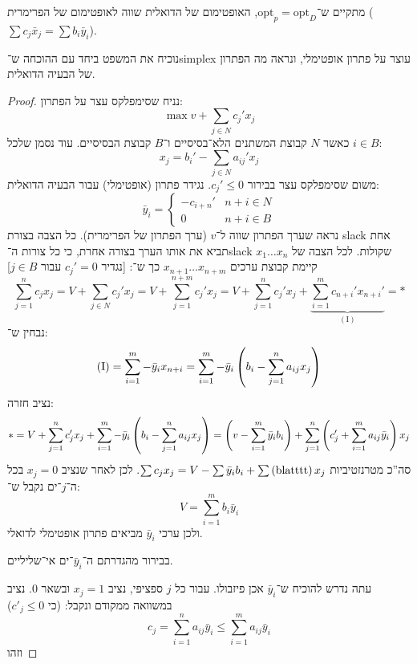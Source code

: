 \documentclass[]{../../../../tex/classes/styledArticle}
\begin{document}
	\begin{Theorem}
		מתקיים ש־$\mathrm{opt}_p = \mathrm{opt}_D$, האופטימום של הדואלית שווה לאופטימום של הפרימרית ($\sum c_j \bar x_j = \sum b_i \bar y_i$). 
	\end{Theorem}
	נוכיח את המשפט ביחד עם ההוכחה ש־simplex עוצר על פתרון אופטימלי, ונראה מה הפתרון של הבעיה הדואלית. 
	\begin{proof}
		נניח שסימפלקס עצר על הפתרון: 
		\[ \max v + \sum_{j \in N}c_j' x_j \]
		כאשר $N$ קבוצת המשתנים הלא־בסיסיים ו־$B$ קבוצת הבסיסיים. עוד נסמן שלכל $i \in B$: 
		\[ x_j = b_i' - \sum_{j \in N}a_{ij}' x_j \]
		משום שסימפלקס עצר בבירור $c_j' \le 0$. נגידר פתרון (אופטימלי) עבור הבעיה הדואלית: 
		\[ \bar y_i = \begin{cases}
			- c_{i + n}' & n + i \in N \\
			0 & n + i \in B
		\end{cases} \]
		נראה שערך הפתרון שווה ל־$v$ (ערך הפתרון של הפרימרית). כל הצבה בצורת slack אחת תביא את אותו הערך בצורה אחרת, כי כל צורות ה־slack שקולות. לכל הצבה של $x_1 \dots x_n$ קיימת קבוצת ערכים $x_{n + 1} \dots x_{n + m}$ כך ש־: [נגדיר $c_j' = 0$ עבור $j \in B$]
		\[ \sum_{j = 1}^{n} c_j x_j = V + \sum_{j \in N} c_j' x_j = V + \sum_{j = 1}^{n + m}c_j' x_j = V + \sum_{j = 1}^{n}c_j'x_j + \underbrace{\sum_{i = 1}^{m}c_{n + i}'x_{n + i}'}_{(\mathrm I)} = * \]
		נבחין ש־: 
		\[ (\mathrm I) = \sum _{i = 1}^{m}- \bar y_i x_{n + i} = \sum_{i = 1}^{m} - \bar y_i\left ( b_i - \sum_{j = 1}^{n}a_{ij} x_j \right ) \]
		נציב חזרה: 
		\[ * = V + \sum_{j = 1}^{n}c_j' x_j + \sum_{i = 1}^{m}- \bar y_i \left ( b_i - \sum_{j = 1}^{n}a_{ij} x_j \right ) = \left ( v - \sum_{i = 1}^{m}\bar y_i b_i \right ) + \sum_{j = 1}^{n}\left ( c_j'+\sum_{i = 1}^{m}a_{ij}\bar y_i \right )x_j \]
		סה''כ מטרנזטיביות $\sum c_j x_j = V - \sum \bar y_i b_i + \sum\left ( \mathrm{blatttt} \right )x_j$. לכן לאחר שנציב $x_j = 0$ בכל ה־$j$־ים נקבל ש־: 
		\[ V = \sum_{i = 1}^{m}b_i \bar y_i  \]
		ולכן ערכי $\bar y_i$ מביאים פתרון אופטימלי לדואלי. 
		
		בבירור מהגדרתם ה־$\bar y_i$־ים אי־שליליים. 
		
		עתה נדרש להוכיח ש־$\bar y_i$ אכן פיזבולו. עבור כל $j$ ספציפי, נציב $x_j= 1$ ובשאר $0$. נציב במשוואה ממקודם ונקבל: (כי $c'_j \le 0$)
		\[ c_j = \sum_{i = 1}^{n}a_{ij} \bar y_i \le \sum_{i = 1}^{m}a_{ij} \bar y_i  \]
		וזהו
	\end{proof}
	
	
	
	\ndoc
\end{document}
